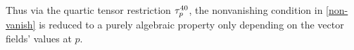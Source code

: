 \documentclass[12pt]{amsart}
\begin{document}
Thus via the quartic tensor restriction $\tau^{40}_p$,
the nonvanishing condition in \eqref{non-vanish}
is reduced to a purely algebraic property
only depending on the vector fields' values at $p$.








%


%
%
%
%
%
\end{document}
